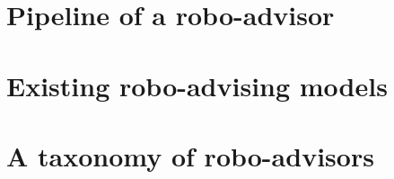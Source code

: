 \section{Pipeline of a robo-advisor}
\section{Existing robo-advising models}
\section{A taxonomy of robo-advisors}
